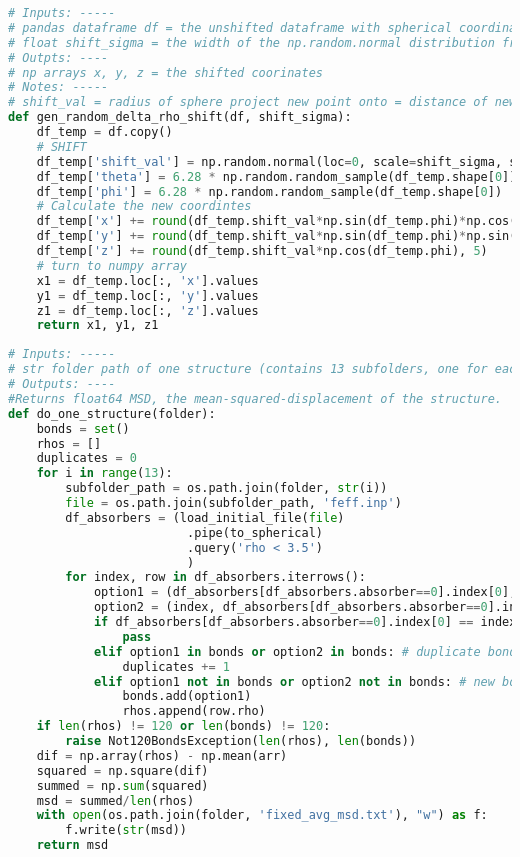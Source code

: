 \begin{lstlisting}[language=Python]
# Inputs: -----
# pandas dataframe df = the unshifted dataframe with spherical coordinates
# float shift_sigma = the width of the np.random.normal distribution from which shift distances are chosen
# Outpts: ----
# np arrays x, y, z = the shifted coorinates
# Notes: -----
# shift_val = radius of sphere project new point onto = distance of new disordered atom from original location
def gen_random_delta_rho_shift(df, shift_sigma):
    df_temp = df.copy()
    # SHIFT
    df_temp['shift_val'] = np.random.normal(loc=0, scale=shift_sigma, size=df_temp.shape[0])
    df_temp['theta'] = 6.28 * np.random.random_sample(df_temp.shape[0])
    df_temp['phi'] = 6.28 * np.random.random_sample(df_temp.shape[0])
    # Calculate the new coordintes
    df_temp['x'] += round(df_temp.shift_val*np.sin(df_temp.phi)*np.cos(df_temp.theta), 5)
    df_temp['y'] += round(df_temp.shift_val*np.sin(df_temp.phi)*np.sin(df_temp.theta), 5)
    df_temp['z'] += round(df_temp.shift_val*np.cos(df_temp.phi), 5)
    # turn to numpy array
    x1 = df_temp.loc[:, 'x'].values
    y1 = df_temp.loc[:, 'y'].values
    z1 = df_temp.loc[:, 'z'].values
    return x1, y1, z1
\end{lstlisting}

\begin{lstlisting}[language=Python]
# Inputs: -----
# str folder path of one structure (contains 13 subfolders, one for each absober)
# Outputs: ----
#Returns float64 MSD, the mean-squared-displacement of the structure.
def do_one_structure(folder):
    bonds = set()
    rhos = []
    duplicates = 0
    for i in range(13):
        subfolder_path = os.path.join(folder, str(i))
        file = os.path.join(subfolder_path, 'feff.inp')
        df_absorbers = (load_initial_file(file)
                         .pipe(to_spherical)
                         .query('rho < 3.5')
                         )
        for index, row in df_absorbers.iterrows():
            option1 = (df_absorbers[df_absorbers.absorber==0].index[0], index)
            option2 = (index, df_absorbers[df_absorbers.absorber==0].index[0])
            if df_absorbers[df_absorbers.absorber==0].index[0] == index:
                pass
            elif option1 in bonds or option2 in bonds: # duplicate bond found
                duplicates += 1
            elif option1 not in bonds or option2 not in bonds: # new bond found
                bonds.add(option1)
                rhos.append(row.rho)
    if len(rhos) != 120 or len(bonds) != 120:
        raise Not120BondsException(len(rhos), len(bonds))
    dif = np.array(rhos) - np.mean(arr)
    squared = np.square(dif)
    summed = np.sum(squared)
    msd = summed/len(rhos)
    with open(os.path.join(folder, 'fixed_avg_msd.txt'), "w") as f:
        f.write(str(msd))
    return msd
\end{lstlisting}



